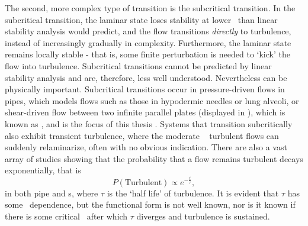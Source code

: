 The second, more complex type of transition is the subcritical transition. In the subcritical transition, the laminar state loses stability at lower \ReN~than linear stability analysis would predict, and the flow transitions \emph{directly} to turbulence, instead of increasingly gradually in complexity. Furthermore, the laminar state remains locally stable - that is, some finite perturbation is needed to `kick' the flow into turbulence. Subcritical transitions cannot be predicted by linear stability analysis and are, therefore, less well understood. Nevertheless can be physically important. Subcritical transitions occur in pressure-driven flows in pipes, which models flows such as those in hypodermic needles or lung alveoli, or shear-driven flow between two infinite parallel plates (displayed in ), which is known as \pCf, and is the focus of this thesis . Systems that transition subcritically also exhibit transient turbulence, where the moderate \ReN~ turbulent flows can suddenly relaminarize, often with no obvious indication. There are also a vast array of studies showing that the probability that a flow remains turbulent decays exponentially, that is
\begin{equation}
P(\textrm{Turbulent}) \propto e^{-\frac{t}{\tau}},
\end{equation}
in both pipe and \pCf s, where $\tau$ is the `half life' of turbulence. It is evident that $\tau$ has some \ReN~dependence, but the functional form is not well known, nor is it known if there is some critical \ReN~after which $\tau$ diverges and turbulence is sustained. 
